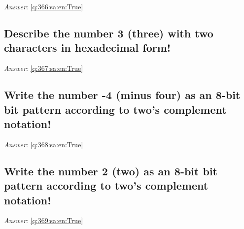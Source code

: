 \documentclass[a4paper,11pt,oneside]{article}
\begin{document}
\begin{sloppypar}
\vspace{2cm}

\noindent\makebox[\textwidth]{\hrulefill}

\vspace{1cm}

\textit{Answer}: \autoref{q:366:sa:en:True}



\subsection{Describe the number 3 (three) with two characters in hexadecimal form!}

\label{q:367:sa:en:False}

\vspace{2cm}

\noindent\makebox[\textwidth]{\hrulefill}

\vspace{1cm}

\textit{Answer}: \autoref{q:367:sa:en:True}



\subsection{Write the number -4 (minus four) as an 8-bit bit pattern according to two's complement notation!}

\label{q:368:sa:en:False}

\vspace{2cm}

\noindent\makebox[\textwidth]{\hrulefill}

\vspace{1cm}

\textit{Answer}: \autoref{q:368:sa:en:True}



\subsection{Write the number 2 (two) as an 8-bit bit pattern according to two's complement notation!}

\label{q:369:sa:en:False}

\vspace{2cm}

\noindent\makebox[\textwidth]{\hrulefill}

\vspace{1cm}

\textit{Answer}: \autoref{q:369:sa:en:True}




\end{sloppypar}
\end{document}
